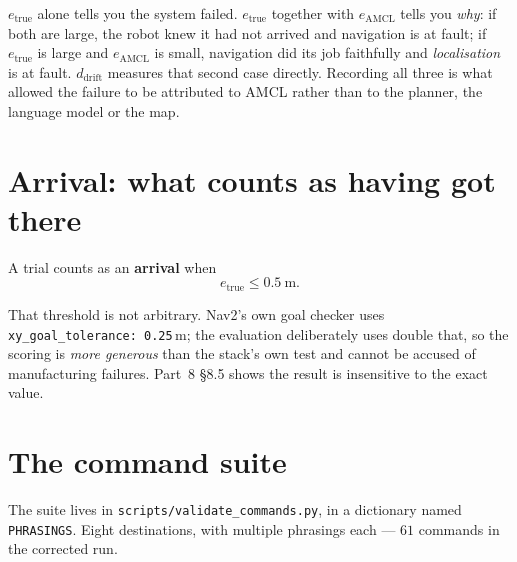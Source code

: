 \documentclass[11pt,a4paper]{report}
\newcommand{\term}[1]{\textcolor{rust}{\textbf{#1}}}
\newcommand{\file}[1]{\texttt{\small #1}}
\begin{document}
\begin{keyidea}
$e_{\text{true}}$ alone tells you the system failed. $e_{\text{true}}$
together with $e_{\text{AMCL}}$ tells you \emph{why}: if both are large, the
robot knew it had not arrived and navigation is at fault; if $e_{\text{true}}$
is large and $e_{\text{AMCL}}$ is small, navigation did its job faithfully and
\emph{localisation} is at fault. $d_{\text{drift}}$ measures that second case
directly. Recording all three is what allowed the failure to be attributed to
AMCL rather than to the planner, the language model or the map.
\end{keyidea}

\section{Arrival: what counts as having got there}

A trial counts as an \term{arrival} when
\[
e_{\text{true}} \le \SI{0.5}{\metre}.
\]

That threshold is not arbitrary. Nav2's own goal checker uses
\file{xy\_goal\_tolerance: 0.25}\,\si{\metre}; the evaluation deliberately uses
double that, so the scoring is \emph{more generous} than the stack's own test
and cannot be accused of manufacturing failures. Part~8 \S8.5 shows the result
is insensitive to the exact value.

\section{The command suite}

The suite lives in \file{scripts/validate\_commands.py}, in a dictionary named
\file{PHRASINGS}. Eight destinations, with multiple phrasings each --- $61$
commands in the corrected run.
\end{document}
